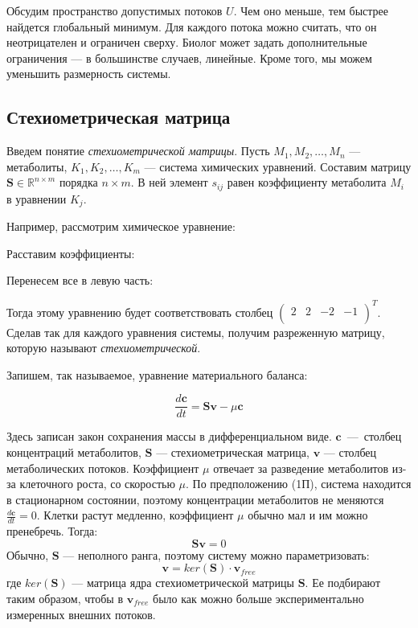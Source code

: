 \documentclass[14pt, a4paper]{extreport}
\begin{document}
Обсудим пространство допустимых потоков $U$. Чем оно меньше, тем быстрее найдется глобальный минимум. Для каждого потока можно считать, что он неотрицателен и ограничен сверху. Биолог может задать дополнительные ограничения --- в большинстве случаев, линейные. Кроме того, мы можем уменьшить размерность системы.

\subsection{Стехиометрическая матрица}

Введем понятие \emph{стехиометрической матрицы}. Пусть $M_1, M_2, \dots, M_n$ --- метаболиты, $K_1, K_2, \dots, K_m$ --- система химических уравнений. 
Составим матрицу $\mathbf{S} \in \mathbb{R}^{n \times m}$ порядка $n \times m$. В ней элемент $s_{ij}$ равен коэффициенту метаболита $M_i$ в уравнении $K_j$.

Например, рассмотрим химическое уравнение:

\begin{center}
\end{center}

Расставим коэффициенты:

\begin{center}
\end{center}

Перенесем все в левую часть:

\begin{center}
\end{center}
Тогда этому уравнению будет соответствовать столбец $\begin{pmatrix}
2 & 2 & -2 & -1\\
\end{pmatrix}^T$. Сделав так для каждого уравнения системы, получим разреженную матрицу, которую называют \emph{стехиометрической}.

Запишем, так называемое, уравнение материального баланса:

$$\frac{d\textbf{c}}{dt} = \textbf{Sv} - \mu{}\textbf{c}$$

Здесь записан закон сохранения массы в дифференциальном виде. $\textbf{c}$~---~столбец концентраций метаболитов, $\textbf{S}$ --- стехиометрическая матрица, $\textbf{v}$ --- столбец метаболических потоков. Коэффициент $\mu$ отвечает за разведение метаболитов из-за клеточного роста, со скоростью $\mu$. По предположению (1П), система находится в стационарном состоянии, поэтому концентрации метаболитов не меняются $\frac{d\textbf{c}}{dt} = 0$. Клетки растут медленно, коэффициент $\mu$ обычно мал и им можно пренебречь. Тогда:
$$ \textbf{Sv} = 0$$
Обычно, $\mathbf{S}$ --- неполного ранга, поэтому систему можно параметризовать:
$$ \mathbf{v} = ker(\mathbf{S}) \cdot \mathbf{v}_{free}$$
где $ker(\textbf{S})$ --- матрица ядра стехиометрической матрицы $\mathbf{S}$. Ее подбирают таким образом, чтобы в $\mathbf{v}_{free}$ было как можно больше экспериментально измеренных внешних потоков.
\end{document}
